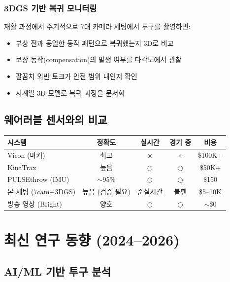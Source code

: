 \documentclass[11pt, a4paper]{report}
\begin{document}
\subsection{3DGS 기반 복귀 모니터링}

재활 과정에서 주기적으로 7대 카메라 세팅에서 투구를 촬영하면:
\begin{itemize}[leftmargin=*]
  \item 부상 전과 동일한 동작 패턴으로 복귀했는지 3D로 비교
  \item 보상 동작(compensation)의 발생 여부를 다각도에서 관찰
  \item 팔꿈치 외반 토크가 안전 범위 내인지 확인
  \item 시계열 3D 모델로 복귀 과정을 문서화
\end{itemize}


\section{웨어러블 센서와의 비교}

\begin{center}
\renewcommand{\arraystretch}{1.3}
\small
\begin{tabular}{p{3cm}cccc}
\toprule
\textbf{시스템} & \textbf{정확도} & \textbf{실시간} & \textbf{경기 중} & \textbf{비용} \\
\midrule
Vicon (마커) & 최고 & $\times$ & $\times$ & \$100K+ \\
KinaTrax & 높음 & $\bigcirc$ & $\bigcirc$ & \$50K+ \\
PULSEthrow (IMU) & $\sim$95\% & $\bigcirc$ & $\bigcirc$ & \$150 \\
본 세팅 (7cam+3DGS) & 높음 (검증 필요) & 준실시간 & 불펜 & \$5--10K \\
방송 영상 (Bright) & 양호 & $\bigcirc$ & $\bigcirc$ & $\sim$\$0 \\
\bottomrule
\end{tabular}
\end{center}


\chapter{최신 연구 동향 (2024--2026)}
\label{ch:trends}

\section{AI/ML 기반 투구 분석}
\end{document}
